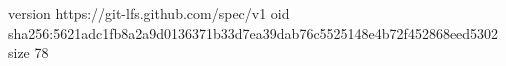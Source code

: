 version https://git-lfs.github.com/spec/v1
oid sha256:5621adc1fb8a2a9d0136371b33d7ea39dab76c5525148e4b72f452868eed5302
size 78
